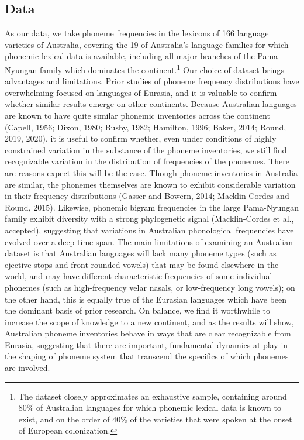 \hypertarget{data}{%
\subsection*{Data}\label{data}}

As our data, we take phoneme frequencies in the lexicons of 166 language varieties of Australia, covering the 19 of Australia's language families for which phonemic lexical data is available, including all major branches of the Pama-Nyungan family which dominates the continent.\footnote{The dataset closely approximates an exhaustive sample, containing around 80\% of Australian languages for which phonemic lexical data is known to exist, and on the order of 40\% of the varieties that were spoken at the onset of European colonization.} Our choice of dataset brings advantages and limitations. Prior studies of phoneme frequency distributions have overwhelming focused on languages of Eurasia, and it is valuable to confirm whether similar results emerge on other continents. Because Australian languages are known to have quite similar phonemic inventories across the continent (Capell, 1956; Dixon, 1980; Busby, 1982; Hamilton, 1996; Baker, 2014; Round, 2019, 2020), it is useful to confirm whether, even under conditions of highly constrained variation in the substance of the phoneme inventories, we still find recognizable variation in the distribution of frequencies of the phonemes. There are reasons expect this will be the case. Though phoneme inventories in Australia are similar, the phonemes themselves are known to exhibit considerable variation in their frequency distributions (Gasser and Bowern, 2014; Macklin-Cordes and Round, 2015). Likewise, phonemic bigram frequencies in the large Pama-Nyungan family exhibit diversity with a strong phylogenetic signal (Macklin-Cordes et al., accepted), suggesting that variations in Australian phonological frequencies have evolved over a deep time span. The main limitations of examining an Australian dataset is that Australian languages will lack many phoneme types (such as ejective stops and front rounded vowels) that may be found elsewhere in the world, and may have different characteristic frequencies of some individual phonemes (such as high-frequency velar nasals, or low-frequency long vowels); on the other hand, this is equally true of the Eurasian languages which have been the dominant basis of prior research. On balance, we find it worthwhile to increase the scope of knowledge to a new continent, and as the results will show, Australian phoneme inventories behave in ways that are clear recognizable from Eurasia, suggesting that there are important, fundamental dynamics at play in the shaping of phoneme system that transcend the specifics of which phonemes are involved.

